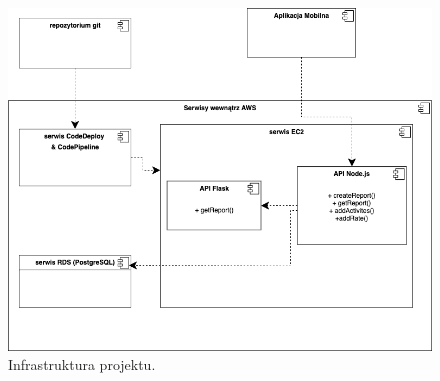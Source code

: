 \documentclass[a4paper,twoside,12pt]{book}
\begin{document}
\begin{description}
\begin{figure}[h!]
    \centering
    \includegraphics[width=\textwidth]{images/general_diagram_track_apps.png}
    \caption{Infrastruktura projektu.\protect\footnotemark}
    \label{fig:general}
\end{figure}




\end{description}
\end{document}
